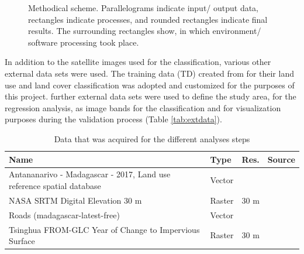 \documentclass[11pt, A4, oneside]{report}
\begin{document}
\begin{figure}[H]
\caption{Methodical scheme. Parallelograms indicate input/ output data, rectangles indicate processes, and rounded rectangles indicate final results. The surrounding rectangles show, in which environment/ software processing took place.}
\label{fig:metsch}
\end{figure}

In addition to the satellite images used for the classification, various other external data sets were used. The training data (TD) created from \citet{Dupuy.2020a} for their land use and land cover classification was adopted and customized for the purposes of this project. further external data sets were used to define the study area, for the regression analysis, as image bands for the classification and for visualization purposes during the validation process (Table \ref{tab:extdata}).

\begin{table}[H]
    \centering
    \caption{Data that was acquired for the different analyses steps}
    \label{tab:extdata}
    \begin{tabular}{p{6.5cm}p{1cm}p{1cm}p{5cm}}
    \hline
      Name & Type & Res. & Source\\
      \hline
      Antananarivo - Madagascar - 2017, Land use reference spatial database & Vector & &  \cite{Defrise.19, Dupuy.2020a} \vspace{4pt}\\ 
     
      NASA SRTM Digital Elevation 30 m & Raster & 30 m & \cite{Farr.2007}\vspace{4pt}\\
      
      Roads (madagascar-latest-free) & Vector & & \cite{Geofabrik, OpenStreetMap}\vspace{4pt}\\
      
      Tsinghua FROM-GLC Year of Change to Impervious Surface  & Raster & 30 m & \cite{Gong.2020}\\
      \hline
       
       
    \end{tabular}
   
    \label{tab:my_label}
\end{table}
\end{document}
